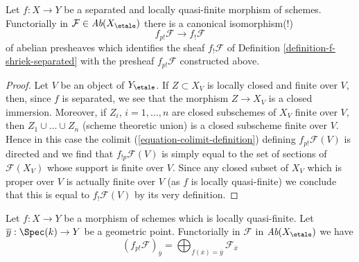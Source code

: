 \begin{lemma}
\label{lemma-finite-support-f-shriek-separated}
Let $f : X \to Y$ be a separated and locally quasi-finite morphism
of schemes. Functorially in $\mathcal{F} \in \textit{Ab}(X_\etale)$
there is a canonical isomorphism(!)
$$
f_{p!}\mathcal{F} \longrightarrow f_!\mathcal{F}
$$
of abelian presheaves which identifies the sheaf
$f_!\mathcal{F}$ of Definition \ref{definition-f-shriek-separated}
with the presheaf $f_{p!}\mathcal{F}$ constructed above.
\end{lemma}

\begin{proof}
Let $V$ be an object of $Y_\etale$. If $Z \subset X_V$ is locally closed
and finite over $V$, then, since $f$ is separated, we see that
the morphism $Z \to X_V$ is a closed immersion. Moreover, if
$Z_i$, $i = 1, \ldots, n$ are closed subschemes of $X_V$ finite
over $V$, then $Z_1 \cup \ldots \cup Z_n$ (scheme theoretic union)
is a closed subscheme finite over $V$. Hence in this case the colimit
(\ref{equation-colimit-definition}) defining $f_{p!}\mathcal{F}(V)$
is directed and we find that $f_{!p}\mathcal{F}(V)$ is simply equal
to the set of sections of $\mathcal{F}(X_V)$ whose support is finite over $V$.
Since any closed subset of $X_V$ which is proper over $V$ is
actually finite over $V$ (as $f$ is locally quasi-finite)
we conclude that this is equal to $f_!\mathcal{F}(V)$
by its very definition.
\end{proof}

\begin{lemma}
\label{lemma-finite-support-stalk}
Let $f : X \to Y$ be a morphism of schemes which is locally quasi-finite.
Let $\overline{y} : \Spec(k) \to Y$ be a geometric point.
Functorially in $\mathcal{F}$ in $\textit{Ab}(X_\etale)$ we have
$$
(f_{p!}\mathcal{F})_{\overline{y}} =
\bigoplus\nolimits_{f(\overline{x}) = \overline{y}} \mathcal{F}_{\overline{x}}
$$
\end{lemma}

